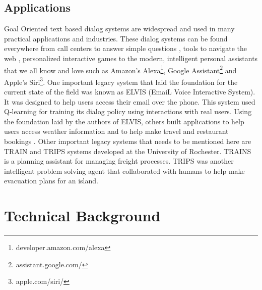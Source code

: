 \documentclass[12pt]{extarticle}
\numberwithin{equation}{section}
\begin{document}
	\subsection{Applications}
	Goal Oriented text based dialog systems are widespread and used in many practical applications and industries. These dialog systems can be found everywhere from call centers to answer simple questions \cite{georgila1998integrated}, tools to navigate the web \cite{chai2001natural}, personalized interactive games\cite{su2013dialoguegame} to the modern, intelligent personal assistants that we all know and love such as Amazon's Alexa\footnote{developer.amazon.com/alexa}, Google Assistant\footnote{assistant.google.com/} and Apple's Siri\footnote{apple.com/siri/}. One important legacy system that laid the foundation for the current state of the field was known as ELVIS (EmaiL Voice Interactive System). It was designed to help users access their email over the phone\cite{ELVIS}. This system used Q-learning for training its dialog policy using interactions with real users. Using the foundation laid by the authors of ELVIS, others built applications to help users access weather information \cite{zue_jupiter} and to help make travel and restaurant bookings \cite{Shriver_unified}. Other important legacy systems that needs to be mentioned here are TRAIN\cite{TRAIN} and TRIPS\cite{ferguson1998trips} systems developed at the University of Rochester. TRAINS is a planning assistant for managing freight processes. TRIPS was another intelligent problem solving agent that collaborated with humans to help make evacuation plans for an island.
	
	\pagebreak
	\section{Technical Background}
\end{document}
